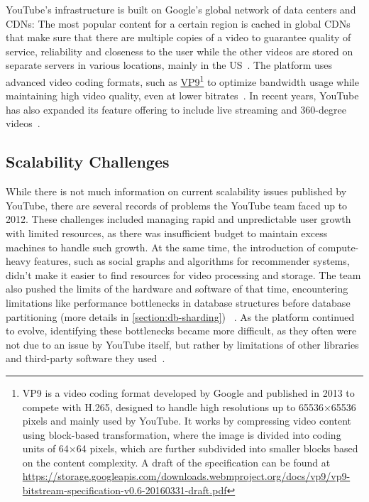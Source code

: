 \noindent YouTube's infrastructure is built on Google's global network of data centers and \ac{CDN}s: The most popular content for a certain region is cached in global \ac{CDN}s that make sure that there are multiple copies of a video to guarantee quality of service, reliability and closeness to the user while the other videos are stored on separate servers in various locations, mainly in the US~\parencite{youtube_architecture_2}. The platform uses advanced video coding formats, such as \href{https://developers.google.com/media/vp9}{VP9}\footnote{VP9 is a video coding format developed by Google and published in 2013 to compete with H.265, designed to handle high resolutions up to 65536×65536 pixels and mainly used by YouTube. It works by compressing video content using block-based transformation, where the image is divided into coding units of 64×64 pixels, which are further subdivided into smaller blocks based on the content complexity. A draft of the specification can be found at \url{https://storage.googleapis.com/downloads.webmproject.org/docs/vp9/vp9-bitstream-specification-v0.6-20160331-draft.pdf}} to optimize bandwidth usage while maintaining high video quality, even at lower bitrates~\parencite{youtube_vpu}. 
In recent years, YouTube has also expanded its feature offering to include live streaming and 360-degree videos~\parencite{youtube_live}.




\subsection{Scalability Challenges}\label{subsection:yt-scalability-challenges}

While there is not much information on current scalability issues published by YouTube, there are several records of problems the YouTube team faced up to 2012. These challenges included managing rapid and unpredictable user growth with limited resources, as there was insufficient budget to maintain excess machines to handle such growth. At the same time, the introduction of compute-heavy features, such as social graphs and algorithms for recommender systems, didn't make it easier to find resources for video processing and storage. The team also pushed the limits of the hardware and software of that time, encountering limitations like performance bottlenecks in database structures before database partitioning (more details in \autoref{section:db-sharding}) ~\parencite{youtube_challenges}. As the platform continued to evolve, identifying these bottlenecks became more difficult, as they often were not due to an issue by YouTube itself, but rather by limitations of other libraries and third-party software they used~\parencite{youtube_challenges_2}.

